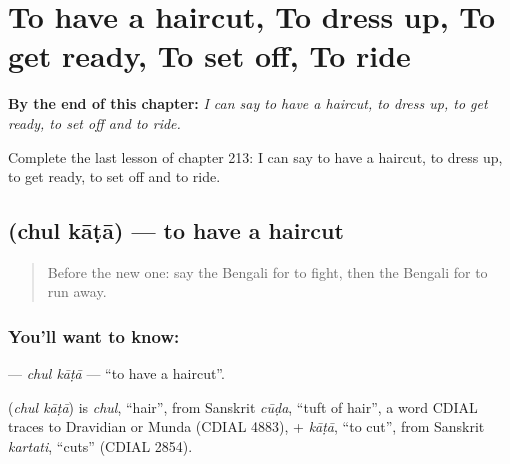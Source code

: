 
\chapter{To have a haircut, To dress up, To get ready, To set off, To ride}
\label{ch:bn-to-have-a-haircut-to-dress-up-to-get-ready-to-set-off-to-ride}

\begin{chapteropening}
\textbf{By the end of this chapter:} \emph{I can say to have a haircut, to dress up, to get ready, to set off and to ride.}

Complete the last lesson of chapter 213: I can say to have a haircut, to dress up, to get ready, to set off and to ride.
\end{chapteropening}

\section[\texorpdfstring{\bn{চুল} \bn{কাটা} (chul kāṭā)}{চুল কাটা (chul kāṭā)}]{  (chul kāṭā) — to have a haircut}

\label{lesson:BN-C213-chul-kata}



\begin{quote}
Before the new one: say the Bengali for to fight, then the Bengali for to run away.
\end{quote}

\subsection*{You'll want to know:  }
\textbf{ } — \emph{chul kāṭā} — \textquotedblleft{}to have a haircut\textquotedblright{}.

\begin{cousinweb}
\textbf{ } (\emph{chul kāṭā}) is \emph{chul}, \textquotedblleft{}hair\textquotedblright{}, from Sanskrit \emph{cūḍa}, \textquotedblleft{}tuft of hair\textquotedblright{}, a word CDIAL traces to Dravidian or Munda (CDIAL 4883), + \emph{kāṭā}, \textquotedblleft{}to cut\textquotedblright{}, from Sanskrit \emph{kartati}, \textquotedblleft{}cuts\textquotedblright{} (CDIAL 2854).
\end{cousinweb}

